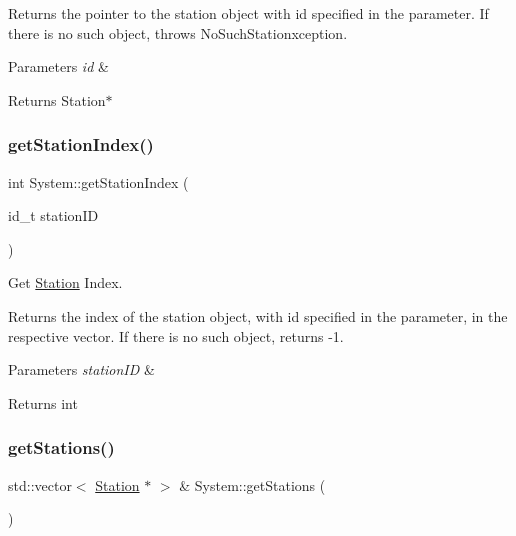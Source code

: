 Returns the pointer to the station object with id specified in the parameter. If there is no such object, throws No\+Such\+Stationxception.


\begin{DoxyParams}{Parameters}
{\em id} & \\
\hline
\end{DoxyParams}
\begin{DoxyReturn}{Returns}
Station$\ast$ 
\end{DoxyReturn}
\mbox{\label{classSystem_a231710db7f31b3fec68f90fd90b292eb}} 
\subsubsection{\texorpdfstring{get\+Station\+Index()}{getStationIndex()}}
{\footnotesize\ttfamily int System\+::get\+Station\+Index (\begin{DoxyParamCaption}\item[{id\+\_\+t}]{station\+ID }\end{DoxyParamCaption})}



Get \mbox{\hyperlink{classStation}{Station}} Index. 

Returns the index of the station object, with id specified in the parameter, in the respective vector. If there is no such object, returns -\/1.


\begin{DoxyParams}{Parameters}
{\em station\+ID} & \\
\hline
\end{DoxyParams}
\begin{DoxyReturn}{Returns}
int 
\end{DoxyReturn}
\mbox{\label{classSystem_a6f27512fba42cc093efd34fe10bf0045}} 
\subsubsection{\texorpdfstring{get\+Stations()}{getStations()}}
{\footnotesize\ttfamily std\+::vector$<$ \mbox{\hyperlink{classStation}{Station}} $\ast$ $>$ \& System\+::get\+Stations (\begin{DoxyParamCaption}{ }\end{DoxyParamCaption})}



